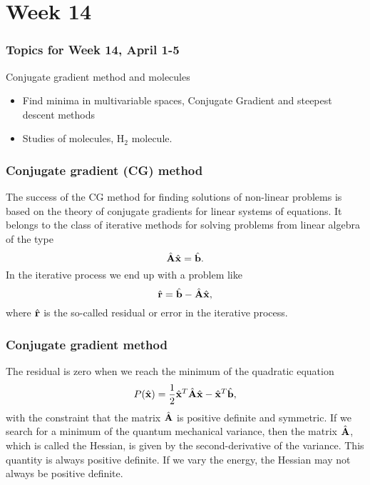\documentclass[compress]{beamer}
\begin{document}
\section[Week 14]{Week 14}
\frame
{
  \frametitle{Topics for Week 14, April 1-5}
  \begin{block}{Conjugate gradient method and molecules}
\begin{itemize}
\item Find minima in multivariable spaces, Conjugate Gradient and steepest descent methods
\item Studies of molecules, H$_2$ molecule.
\end{itemize}
  \end{block}
} 



\frame
{
  \frametitle{Conjugate gradient (CG) method}
\begin{small}
{\scriptsize
The success of the CG method  for finding solutions of non-linear problems is based
on the theory of conjugate gradients for linear systems of equations. It belongs
to the class of iterative methods for solving problems from linear algebra of the type
\[
  \hat{{\bf A}}\hat{\bf {x}} = \hat{\bf {b}}.
\]
In the iterative process we end up with a problem like
\[
  \hat{\bf {r}}= \hat{\bf {b}}-\hat{{\bf A}}\hat{\bf {x}},
\]
where $\hat{\bf {r}}$ is the so-called residual or error in the iterative process.
}
\end{small}
}


\frame
{
  \frametitle{Conjugate gradient method}
\begin{small}
{\scriptsize
The residual is zero when we reach the minimum of the quadratic equation
\[
  P(\hat{\bf {x}})=\frac{1}{2}\hat{\bf {x}}^T\hat{{\bf A}}\hat{\bf {x}} - \hat{\bf {x}}^T\hat{\bf {b}},
\]
with the constraint that the matrix $\hat{{\bf A}}$ is positive definite and symmetric.
If we search for a minimum of the quantum mechanical  variance, then the matrix 
$\hat{{\bf A}}$, which is called the Hessian, is given by the second-derivative of the variance.  This quantity is always positive definite. If we vary the energy, the Hessian may not always be positive definite. 
}
\end{small}
}


\end{document}
